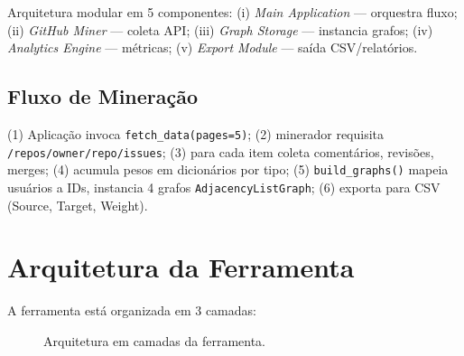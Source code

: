 \documentclass[12pt,a4paper]{article}
\begin{document}
Arquitetura modular em 5 componentes: (i) \textit{Main Application} — orquestra fluxo; (ii) \textit{GitHub Miner} — coleta API; (iii) \textit{Graph Storage} — instancia grafos; (iv) \textit{Analytics Engine} — métricas; (v) \textit{Export Module} — saída CSV/relatórios.

\subsection{Fluxo de Mineração}

(1) Aplicação invoca \texttt{fetch\_data(pages=5)}; (2) minerador requisita \texttt{/repos/owner/repo/issues}; (3) para cada item coleta comentários, revisões, merges; (4) acumula pesos em dicionários por tipo; (5) \texttt{build\_graphs()} mapeia usuários a IDs, instancia 4 grafos \texttt{AdjacencyListGraph}; (6) exporta para CSV (Source, Target, Weight).


\section{Arquitetura da Ferramenta}\label{sec:arquitetura}

A ferramenta está organizada em 3 camadas:

\begin{figure}[h]
  \centering
  \caption{Arquitetura em camadas da ferramenta.}
  \label{fig:arquitetura}
\end{figure}
\end{document}
